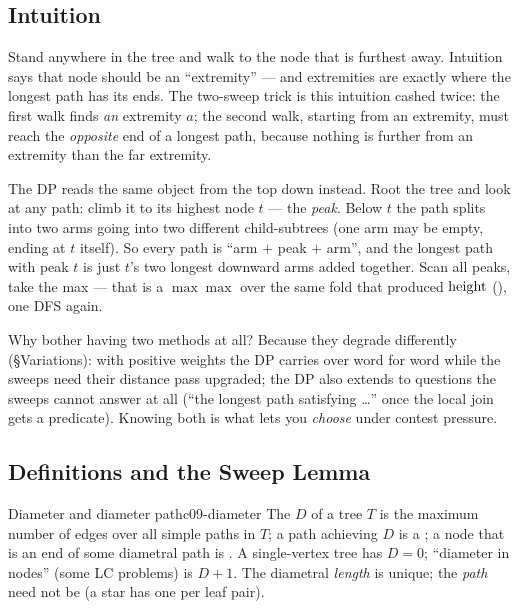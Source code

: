 \subsection{Intuition}

Stand anywhere in the tree and walk to the node that is furthest away. Intuition says
that node should be an ``extremity'' --- and extremities are exactly where the longest
path has its ends. The two-sweep trick is this intuition cashed twice: the first walk
finds \emph{an} extremity $a$; the second walk, starting from an extremity, must reach
the \emph{opposite} end of a longest path, because nothing is further from an extremity
than the far extremity.

The DP reads the same object from the top down instead. Root the tree and look at any
path: climb it to its highest node $t$ --- the \emph{peak}. Below $t$ the path splits
into two arms going into two different child-subtrees (one arm may be empty, ending at
$t$ itself). So every path is ``arm $+$ peak $+$ arm'', and the longest path with peak
$t$ is just $t$'s two longest downward arms added together. Scan all peaks, take the
max --- that is a $\max\max$ over the same fold that produced $\operatorname{height}$
(), one DFS again.

Why bother having two methods at all? Because they degrade differently (§Variations):
with positive weights the DP carries over word for word while the sweeps need their
distance pass upgraded; the DP also extends to questions the sweeps cannot answer at all
(``the longest path satisfying \ldots'' once the local join gets a predicate). Knowing
both is what lets you \emph{choose} under contest pressure.

\subsection{Definitions and the Sweep Lemma}

\begin{definition}{Diameter and diameter path}{c09-diameter}
The  $D$ of a tree $T$ is the maximum number of edges over all simple
paths in $T$; a path achieving $D$ is a ; a node that is an end of
some diametral path is . A single-vertex tree has $D=0$; ``diameter in
nodes'' (some LC problems) is $D+1$. The diametral \emph{length} is unique; the
\emph{path} need not be (a star has one per leaf pair).
\end{definition}

